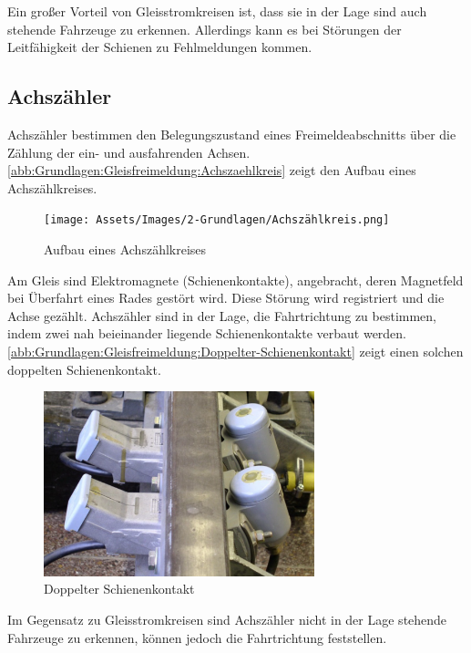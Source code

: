 Ein großer Vorteil von Gleisstromkreisen ist, dass sie in der Lage sind auch stehende Fahrzeuge zu erkennen. Allerdings kann es bei Störungen der Leitfähigkeit der Schienen zu Fehlmeldungen kommen.

\subsection{Achszähler}\label{text:Grundlagen:Gleisfreimeldung:Achszähler}

Achszähler bestimmen den Belegungszustand eines Freimeldeabschnitts über die Zählung der ein- und ausfahrenden Achsen.~\cite[][S. 53]{bib:Sicherung-des-Schienenverkehrs} \autoref{abb:Grundlagen:Gleisfreimeldung:Achszaehlkreis} zeigt den Aufbau eines Achszählkreises.

\begin{figure}[H]
    \centering
    \texttt{[image: Assets/Images/2-Grundlagen/Achszählkreis.png]}
    \caption{Aufbau eines Achszählkreises~\cite[][S. 53]{bib:Sicherung-des-Schienenverkehrs}}\label{abb:Grundlagen:Gleisfreimeldung:Achszaehlkreis}
\end{figure}

Am Gleis sind Elektromagnete (Schienenkontakte), angebracht, deren Magnetfeld bei Überfahrt eines Rades gestört wird. Diese Störung wird registriert und die Achse gezählt. Achszähler sind in der Lage, die Fahrtrichtung zu bestimmen, indem zwei nah beieinander liegende Schienenkontakte verbaut werden.~\cite[][S. 53 ff.]{bib:Sicherung-des-Schienenverkehrs} \autoref{abb:Grundlagen:Gleisfreimeldung:Doppelter-Schienenkontakt} zeigt einen solchen doppelten Schienenkontakt.

\begin{figure}[H]
    \centering
    \includegraphics[width=0.7\textwidth]{Assets/Images/2-Grundlagen/Doppelter-Schienenkontakt.png}
    \caption{Doppelter Schienenkontakt~\cite[][S. 54]{bib:Sicherung-des-Schienenverkehrs}}\label{abb:Grundlagen:Gleisfreimeldung:Doppelter-Schienenkontakt}
\end{figure}

Im Gegensatz zu Gleisstromkreisen sind Achszähler nicht in der Lage stehende Fahrzeuge zu erkennen, können jedoch die Fahrtrichtung feststellen.
